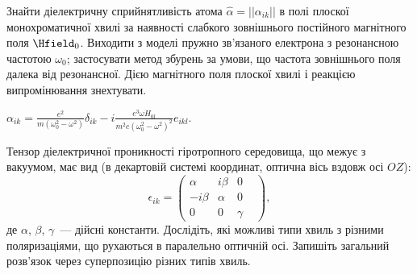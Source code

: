 \begin{problem}%
Знайти діелектричну сприйнятливість атома $\hat\alpha = || \alpha_{ik} ||$ в полі плоскої
монохроматичної хвилі за наявності слабкого зовнішнього постійного магнітного поля $\Hfield_0$.
Виходити з моделі пружно зв'язаного електрона з резонансною частотою $\omega_0$; застосувати метод
збурень за умови, що частота зовнішнього поля далека від резонансної. Дією магнітного поля плоскої
хвилі і реакцією випромінювання знехтувати.
\begin{solution}
	$\alpha_{ik} = \frac{e^2}{m(\omega_0^2 - \omega^2)}\delta_{ik} - i \frac{e^3\omega
			H_{0l}}{m^2c(\omega_0^2 - \omega^2)^2}e_{ikl}$.
\end{solution}
\end{problem}

\begin{problem}\label{pr:etensor}

Тензор діелектричної проникності гіротропного середовища, що межує з вакуумом, має вид (в декартовій
системі координат, оптична вісь вздовж осі $OZ$):
\begin{equation}\label{eq:etensor}
	\epsilon_{ik}  = \left( {\begin{array}{*{20}{c}}
			\alpha       & {i\beta } & 0      & \\
			{ - i\beta } & \alpha    & 0      & \\
			0            & 0         & \gamma &
		\end{array}} \right),
\end{equation}
де $\alpha$, $\beta$, $\gamma$~--- дійсні константи.  Дослідіть, які можливі типи хвиль з різними
поляризаціями, що рухаються в паралельно оптичній осі. Запишіть загальний розв’язок через суперпозицію
різних типів хвиль.

\end{problem}

